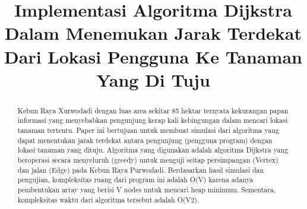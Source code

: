 \documentclass[conference]{IEEEtran}
\title{Implementasi Algoritma Dijkstra Dalam
Menemukan Jarak Terdekat Dari Lokasi Pengguna
Ke Tanaman Yang Di Tuju}
\begin{document}
\maketitle

\begin{abstract}
    Kebun Raya Xurwodadi dengan luas area sekitar 85
    hektar ternyata kekurangan papan informasi yang menyebabkan
    pengunjung kerap kali kebingungan dalam mencari lokasi tanaman tertentu. 
    Paper ini bertujuan untuk membuat simulasi
    dari algoritma yang dapat menentukan jarak terdekat antara
    pengunjung (pengguna program) dengan lokasi tanaman yang
    dituju. Algoritma yang digunakan adalah algoritma Dijkstra
    yang beroperasi secara menyeluruh (greedy) untuk menguji
    seitap persimpangan (Vertex) dan jalan (Edge) pada Kebun
    Raya Purwodadi. Berdasarkan hasil simulasi dan pengujian,
    kompleksitas ruang dari program ini adalah O(V) karena adanya
    pembentukan array yang berisi V nodes untuk mencari heap minimum. 
    Sementara, kompleksitas waktu dari algoritma tersebut adalah O(V2).
\end{abstract}
\end{document}
